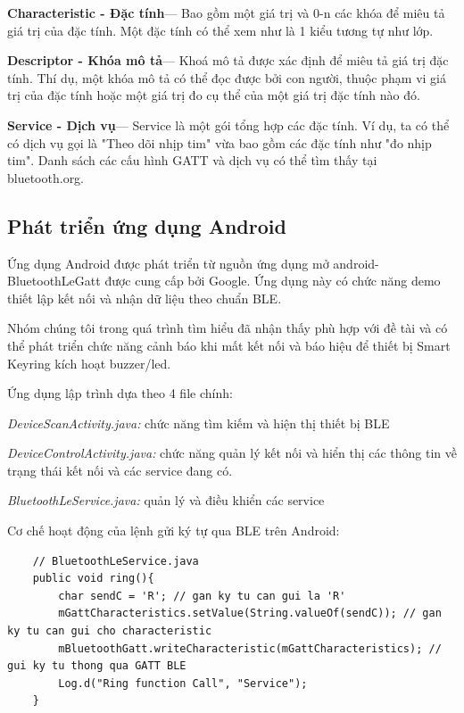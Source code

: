 \textbf{Characteristic -  Đặc tính}— Bao gồm một giá trị và 0-n các khóa để miêu tả giá trị của đặc tính. Một đặc tính có thể xem như là 1 kiểu tương tự như lớp.

\textbf{Descriptor - Khóa mô tả}— Khoá mô tả được xác định để miêu tả giá trị đặc tính. Thí dụ, một khóa mô tả có thể đọc được bởi con người, thuộc phạm vi giá trị của đặc tính hoặc một giá trị đo cụ thể của một giá trị đặc tính nào đó.

\textbf{Service - Dịch vụ}— Service là một gói tổng hợp các đặc tính. Ví dụ, ta có thể có dịch vụ gọi là "Theo dõi nhịp tim" vừa bao gồm các đặc tính như "đo nhịp tim". Danh sách các cấu hình GATT và dịch vụ có thể tìm thấy tại bluetooth.org.

\subsection{Phát triển ứng dụng Android}
Ứng dụng Android được phát triển từ nguồn ứng dụng mở android-BluetoothLeGatt\cite{blegatt} được cung cấp bởi Google. Ứng dụng này có chức năng demo thiết lập kết nối và nhận dữ liệu theo chuẩn BLE.

Nhóm chúng tôi trong quá trình tìm hiểu đã nhận thấy phù hợp với đề tài và có thể phát triển chức năng cảnh báo khi mất kết nối và báo hiệu để thiết bị Smart Keyring kích hoạt buzzer/led.


Ứng dụng lập trình dựa theo 4 file chính:

\textit{DeviceScanActivity.java:} chức năng tìm kiếm và hiện thị thiết bị BLE

\textit{DeviceControlActivity.java:} chức năng quản lý kết nối và hiển thị các thông tin về trạng thái kết nối và các service đang có.

\textit{BluetoothLeService.java:} quản lý và điều khiển các service

Cơ chế hoạt động của lệnh gửi ký tự qua BLE trên Android:

\begin{lstlisting}
	// BluetoothLeService.java
    public void ring(){
	    char sendC = 'R'; // gan ky tu can gui la 'R'
	    mGattCharacteristics.setValue(String.valueOf(sendC)); // gan ky tu can gui cho characteristic
	    mBluetoothGatt.writeCharacteristic(mGattCharacteristics); // gui ky tu thong qua GATT BLE
	    Log.d("Ring function Call", "Service");
    }
\end{lstlisting}

